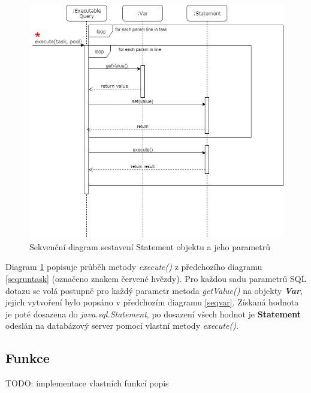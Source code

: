 \documentclass[czech,bachelor,public,dept460,male,cpdeclaration,twoside]{diploma}
\begin{document}
\begin{figure}[!htbp]\centering\includegraphics[width=1.0\textwidth]{Figures/getvalues.png}\caption{Sekvenční diagram sestavení Statement objektu a jeho parametrů}
\label{getvalues}
\end{figure}

Diagram \ref{getvalues} popisuje průběh metody \textit{execute()} z předchozího diagramu \ref{seqruntask} (označeno znakem červené hvězdy). Pro každou sadu parametrů SQL dotazu se volá postupně pro každý parametr metoda \textit{getValue()} na objekty \textbf{\emph{Var}}, jejich vytvoření bylo popsáno v předchozím diagramu \ref{seqvar}. Získaná hodnota je poté dosazena do \textit{java.sql.Statement}, po dosazení všech hodnot je \textbf{Statement} odeslán na databázový server pomocí vlastní metody \textit{execute()}.


\subsection{Funkce} \label{functions}

TODO: implementace vlastních funkcí popis
\end{document}
